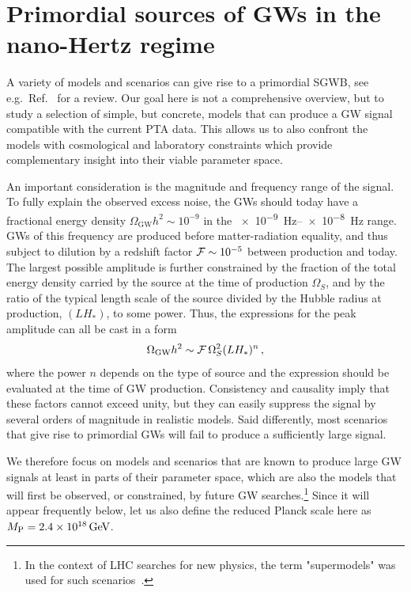 \documentclass{article}
\newcommand*{\GW}{\ensuremath{\mathrm{GW}}\xspace}
\begin{document}
\section{Primordial sources of GWs in the nano-Hertz regime}
\label{sec:sources}

A variety of models and scenarios can give rise to a primordial SGWB, see e.g.\ Ref.~\cite{Caprini:2018mtu} for a review. Our goal here is not a comprehensive overview, but to study a selection of simple, but concrete, models that can produce a GW signal compatible with the current PTA data. This allows us to also confront the models with cosmological and laboratory constraints which provide complementary insight into their viable parameter space. 

An important consideration is the magnitude and frequency range of the signal. To fully explain the observed excess noise, the GWs should today have a fractional energy density $\Omega_\GW h^2 \sim 10^{-9}$ in the \SIrange{e-9}{e-8}{\Hz} range. GWs of this frequency are produced before matter-radiation equality, and thus subject to dilution by a redshift factor ${\cal F} \sim 10^{-5}$ between production and today. The largest possible amplitude is further constrained by the fraction of the total energy density carried by the source at the time of production $\Omega_S$, and by the ratio of the typical length scale of the source divided by the Hubble radius at production, $(LH_*)$, to some power. Thus, the expressions for the peak amplitude can all be cast in a form 
\begin{equation}
    \Omega_{\GW}h^2 \sim {\cal F}\, \Omega_S^2 (L H_*)^n\,,
\end{equation}
%
where the power $n$ depends on the type of source and the expression should be evaluated at the time of GW production. 
Consistency and causality imply that these factors cannot exceed unity, but they can easily suppress the signal by several orders of magnitude in realistic models. Said differently, most scenarios that give rise to primordial GWs will fail to produce a sufficiently large signal. 

We therefore focus on models and scenarios that are known to produce large GW signals at least in parts of their parameter space, which are also the models that will first be observed, or constrained, by future GW searches.\footnote{In the context of LHC searches for new physics, the term "supermodels" was used for such scenarios~\cite{Bauer:2009cc}.} Since it will appear frequently below, let us also define the reduced Planck scale here as~$M_{\rm P} = \SI{2.4e18}{\GeV}$. 
\end{document}
